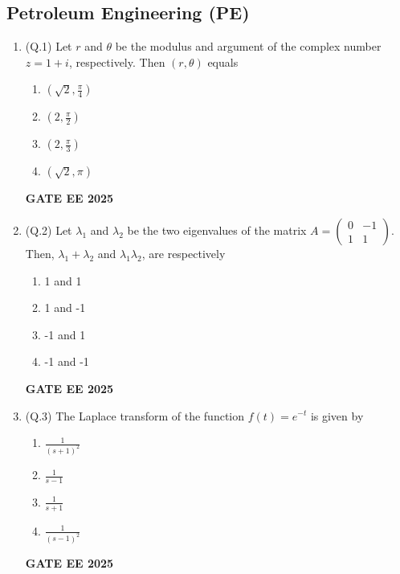 \documentclass{article}
\begin{document}
\subsection*{Petroleum Engineering (PE)}

\begin{enumerate}[leftmargin=*,label=\textbf{Q.\arabic*},start=1]
    \item (Q.1) Let $r$ and $\theta$ be the modulus and argument of the complex number $z = 1 + i$, respectively. Then $(r, \theta)$ equals
    \begin{multicols}{4}
    \begin{enumerate}[label=(\Alph*)]
        \item $(\sqrt{2}, \frac{\pi}{4})$
        \item $(2, \frac{\pi}{2})$
        \item $(2, \frac{\pi}{3})$
        \item $(\sqrt{2}, \pi)$
    \end{enumerate}
    \end{multicols}
    \textbf{GATE EE 2025}

    \item (Q.2) Let $\lambda_1$ and $\lambda_2$ be the two eigenvalues of the matrix $A = \begin{pmatrix} 0 & -1 \\ 1 & 1 \end{pmatrix}$. Then, $\lambda_1 + \lambda_2$ and $\lambda_1 \lambda_2$, are respectively
    \begin{multicols}{4}
    \begin{enumerate}[label=(\Alph*)]
        \item 1 and 1
        \item 1 and -1
        \item -1 and 1
        \item -1 and -1
    \end{enumerate}
    \end{multicols}
    \textbf{GATE EE 2025}

    \item (Q.3) The Laplace transform of the function $f(t) = e^{-t}$ is given by
    \begin{multicols}{4}
    \begin{enumerate}[label=(\Alph*)]
        \item $\frac{1}{(s+1)^2}$
        \item $\frac{1}{s-1}$
        \item $\frac{1}{s+1}$
        \item $\frac{1}{(s-1)^2}$
    \end{enumerate}
    \end{multicols}
    \textbf{GATE EE 2025}


\end{enumerate}
\end{document}
